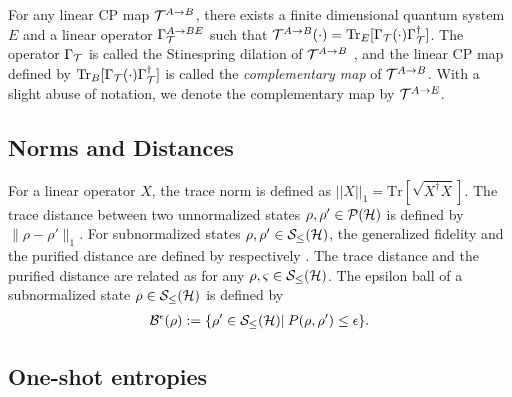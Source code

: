 \documentclass[journal]{IEEEtran}
\newcommand{\tr}{\mathrm{Tr}}
\begin{document}
For any linear CP map ${\mathcal T}^{A\rightarrow B}$, there exists a finite dimensional quantum system $E$ and a linear operator $\Gamma_{{\mathcal T}}^{A\rightarrow BE}$ such that ${\mathcal T}^{A\rightarrow B}(\cdot)={\rm Tr}_E[\Gamma_{{\mathcal T}}(\cdot)\Gamma_{{\mathcal T}}^\dagger]$.
The operator $\Gamma_{{\mathcal T}}$ is called the Stinespring dilation of ${\mathcal T}^{A\rightarrow B}$ \cite{stinespring1955positive},
and the linear CP map defined by ${\rm Tr}_B[\Gamma_{{\mathcal T}}(\cdot)\Gamma_{{\mathcal T}}^\dagger]$ is called the {\it complementary map} of ${\mathcal T}^{A\rightarrow B}$.
With a slight abuse of notation, we denote the complementary map by ${\mathcal T}^{A\rightarrow E}$.



\subsection{Norms and Distances}

For a linear operator $X$, the trace norm is defined as $|\! | X |\! |_1 = \tr[ \sqrt{X^{\dagger}X}]$. 
The trace distance between two unnormalized states $\rho,\rho'\in{\mathcal P}({\mathcal H})$ is defined by $\|\rho-\rho'\|_1$. 
For subnormalized states $\rho,\rho'\in{\mathcal S}_\leq({\mathcal H})$, the generalized fidelity and the purified distance are defined by
respectively \cite{tomamichel2010duality}.
The trace distance and the purified distance are related as
for any $\rho,\varsigma\in{\mathcal S}_\leq({\mathcal H})$.
The epsilon ball of a subnormalized state $\rho\in{\mathcal S}_\leq({\mathcal H})$ is defined by
\begin{align}
\ca{B}^\epsilon(\rho):=\{\rho'\in\ca{S}_\leq(\ca{H})|\:P(\rho,\rho')\leq\epsilon\}.
\label{eq:epsilon}
\end{align}



\subsection{One-shot entropies}
\end{document}
